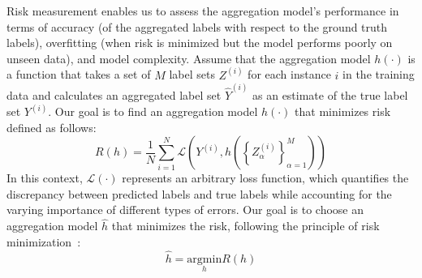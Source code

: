 Risk measurement enables us to assess the aggregation model's performance in terms of accuracy (of the aggregated labels with respect to the ground truth labels), overfitting (when risk is minimized but the model performs poorly on unseen data), and model complexity.
Assume that the aggregation model $h (\cdot) $ is a function that takes a set of $M $ label sets $Z^{(i)} $ for each instance $i $ in the training data and calculates an aggregated label set $\widehat{Y}^{(i)} $ as an estimate of the true label set $Y^{(i)} $. Our goal is to find an aggregation model $h(\cdot) $ that minimizes risk defined as follows:
\begin{equation}
R(h) = \frac{1}{N} \sum_{i=1}^{N} \mathcal{L} \left( Y^{(i)}, h\left(\left\{Z_{\alpha}^{(i)}\right\}_{\alpha=1}^{M}\right)\right)
\label{eq:crowd.Eq.2.risk.emp}
\end{equation}
In this context, $\mathcal{L}(\cdot) $ represents an arbitrary loss function, which quantifies the discrepancy between predicted labels and true labels while accounting for the varying importance of different types of errors.
Our goal is to choose an aggregation model $\widehat{h} $ that minimizes the risk, following the principle of risk minimization~\cite{vapnik_Principles_1991}:
\begin{equation}
\widehat{h} = \underset{h}{\text{argmin}}  R(h)
\label{eq:crowd.Eq.3.risk.h}
\end{equation}

